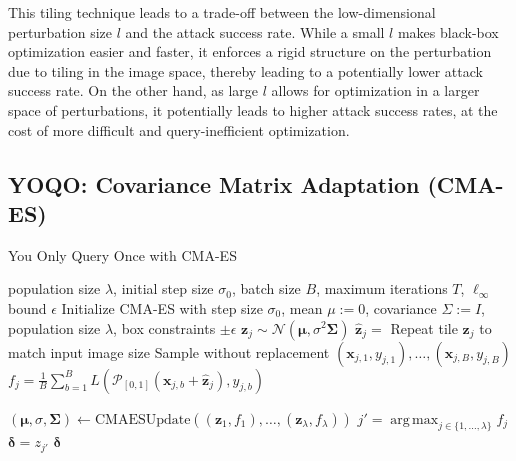 \documentclass[letterpaper]{article}
\DeclareMathOperator*{\argmax}{arg\,max}
\begin{document}
	This tiling technique leads to a trade-off between the low-dimensional perturbation size $l$ and the attack success rate. While a small $l$ makes black-box optimization easier and faster, it enforces a rigid structure on the perturbation due to tiling in the image space, thereby leading to a potentially lower attack success rate. On the other hand, as large $l$ allows for optimization in a larger space of perturbations, it potentially leads to higher attack success rates, at the cost of more difficult and query-inefficient optimization.
	
	
	\subsection{YOQO: Covariance Matrix Adaptation (CMA-ES)}
	\begin{algorithm*}[t]
		\caption{You Only Query Once with CMA-ES}
		\label{alg:yoqo}
		\begin{algorithmic}[1]
			\noindent \State population size $\lambda$, initial step size $\sigma_0$, batch size $B$, maximum iterations $T$, $\ell_{\infty}$ bound $\epsilon$
			\noindent \State Initialize CMA-ES with step size $\sigma_0$, mean $\mu:=0$, covariance $\Sigma:=I$, population size $\lambda$, box constraints $\pm \epsilon$
			\noindent{}
			\noindent{}
			\State $\mathbf{z}_j \sim \mathcal{N}(\boldsymbol{\mu}, \sigma^2 \bm{\Sigma})$
			\noindent{}
			\noindent\State $\mathbf{\hat z}_j = $ Repeat tile $\mathbf{z}_j$ to match input image size
			\noindent\State Sample without replacement $(\mathbf{x}_{j,1},y_{j,1}),\ldots, (\mathbf{x}_{j,B}, y_{j,B})$
			\noindent\State $f_j = \frac{1}{B}\sum_{b=1}^B L(\mathcal{P}_{[0,1]}(\mathbf{x}_{j,b} + \mathbf{\hat z}_j), y_{j,b})$  
			
			\EndFor
			\State $(\boldsymbol{\mu}, \sigma, \bm{\Sigma}) \leftarrow \text{CMAESUpdate}((\mathbf{z}_1, f_1), \ldots, (\mathbf{z}_\lambda, f_\lambda))$ 
			\State $j'=\argmax_{j\in\{1,\ldots, \lambda\}} f_j$ 
			\State $\boldsymbol{\delta} = z_{j'}$ 
			\EndFor
			\State \Return $\boldsymbol{\delta}$
			\EndProcedure
		\end{algorithmic}
	\end{algorithm*}
	
\end{document}
